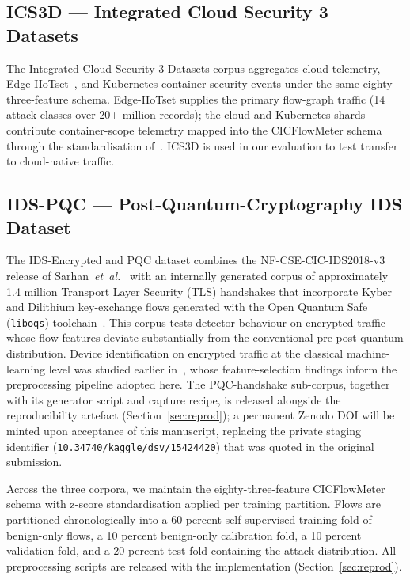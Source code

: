 \documentclass{ieeeaccess}
\begin{document}
\subsection{ICS3D --- Integrated Cloud Security 3 Datasets}
The Integrated Cloud Security 3 Datasets corpus aggregates cloud telemetry,
Edge-IIoTset~\cite{ferrag2022edgeiiot}, and Kubernetes container-security
events under the same eighty-three-feature schema. Edge-IIoTset supplies
the primary flow-graph traffic (14 attack classes over 20+ million
records); the cloud and Kubernetes shards contribute container-scope
telemetry mapped into the CICFlowMeter schema through the standardisation
of~\cite{sarhan2022standard}. ICS3D is used in our evaluation to test
transfer to cloud-native traffic.

\subsection{IDS-PQC --- Post-Quantum-Cryptography IDS Dataset}
The IDS-Encrypted and PQC dataset combines the NF-CSE-CIC-IDS2018-v3
release of Sarhan~\emph{et~al.}~\cite{sarhan2022standard} with an
internally generated corpus of approximately 1.4 million Transport Layer
Security (TLS) handshakes that incorporate Kyber and Dilithium
key-exchange flows generated with the Open Quantum Safe
(\texttt{liboqs}) toolchain~\cite{stebila2020liboqs}. This corpus tests
detector behaviour on encrypted traffic whose flow features deviate
substantially from the conventional pre-post-quantum distribution. Device
identification on encrypted traffic at the classical machine-learning
level was studied earlier in~\cite{anaedevha2024deviceid}, whose
feature-selection findings inform the preprocessing pipeline adopted here.
The PQC-handshake sub-corpus, together with its generator script and
capture recipe, is released alongside the reproducibility artefact
(Section~\ref{sec:reprod}); a permanent Zenodo DOI will be minted upon
acceptance of this manuscript, replacing the private staging identifier
(\texttt{10.34740/kaggle/dsv/15424420}) that was quoted in the original
submission.

Across the three corpora, we maintain the eighty-three-feature
CICFlowMeter schema with z-score standardisation applied per training
partition. Flows are partitioned chronologically into a 60 percent
self-supervised training fold of benign-only flows, a 10 percent
benign-only calibration fold, a 10 percent validation fold, and a 20
percent test fold containing the attack distribution. All preprocessing
scripts are released with the implementation
(Section~\ref{sec:reprod}).
\end{document}

